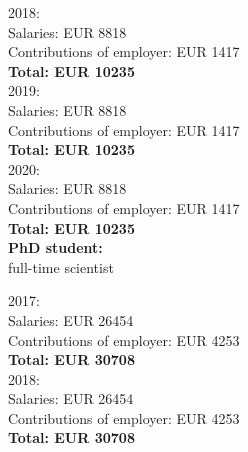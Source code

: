 \documentclass[11pt,dvipsnames,usenames,a4paper]{article}
\begin{document}
2018: \\
Salaries: EUR 8818 \\
Contributions of employer: EUR 1417 \\
{\bf Total: EUR 10235} \\
 

2019: \\
Salaries: EUR 8818 \\
Contributions of employer: EUR 1417 \\
{\bf Total: EUR 10235} \\


2020: \\

Salaries: EUR 8818 \\
Contributions of employer: EUR 1417 \\
{\bf Total: EUR 10235} \\


\textbf{PhD student:} \\
full-time scientist

2017: \\

Salaries: EUR 26454 \\
Contributions of employer: EUR 4253 \\
{\bf Total: EUR 30708} \\


2018: \\

Salaries: EUR 26454 \\
Contributions of employer: EUR 4253 \\
{\bf Total: EUR 30708} \\
\end{document}
